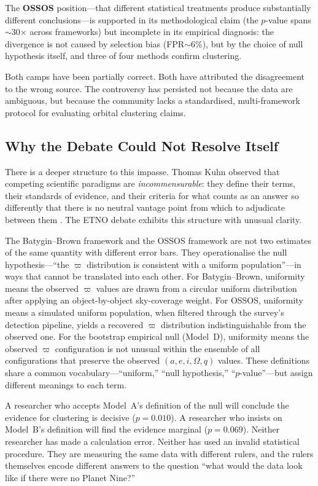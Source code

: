 \documentclass[12pt,a4paper]{article}
\begin{document}
The \textbf{OSSOS} position---that different statistical treatments produce substantially different conclusions---is supported in its methodological claim (the $p$-value spans $\sim$30$\times$ across frameworks) but incomplete in its empirical diagnosis: the divergence is not caused by selection bias (FPR$\sim$6\%), but by the choice of null hypothesis itself, and three of four methods confirm clustering.

Both camps have been partially correct. Both have attributed the disagreement to the wrong source. The controversy has persisted not because the data are ambiguous, but because the community lacks a standardised, multi-framework protocol for evaluating orbital clustering claims.

\subsection{Why the Debate Could Not Resolve Itself}

There is a deeper structure to this impasse. Thomas Kuhn observed that competing scientific paradigms are \textit{incommensurable}: they define their terms, their standards of evidence, and their criteria for what counts as an answer so differently that there is no neutral vantage point from which to adjudicate between them \cite{kuhn1962}. The ETNO debate exhibits this structure with unusual clarity.

The Batygin--Brown framework and the OSSOS framework are not two estimates of the same quantity with different error bars. They operationalise the null hypothesis---``the $\varpi$ distribution is consistent with a uniform population''---in ways that cannot be translated into each other. For Batygin--Brown, uniformity means the observed $\varpi$ values are drawn from a circular uniform distribution after applying an object-by-object sky-coverage weight. For OSSOS, uniformity means a simulated uniform population, when filtered through the survey's detection pipeline, yields a recovered $\varpi$ distribution indistinguishable from the observed one. For the bootstrap empirical null (Model~D), uniformity means the observed $\varpi$ configuration is not unusual within the ensemble of all configurations that preserve the observed $(a, e, i, \Omega, q)$ values. These definitions share a common vocabulary---``uniform,'' ``null hypothesis,'' ``$p$-value''---but assign different meanings to each term.

A researcher who accepts Model~A's definition of the null will conclude the evidence for clustering is decisive ($p=0.010$). A researcher who insists on Model~B's definition will find the evidence marginal ($p=0.069$). Neither researcher has made a calculation error. Neither has used an invalid statistical procedure. They are measuring the same data with different rulers, and the rulers themselves encode different answers to the question ``what would the data look like if there were no Planet Nine?''
\end{document}
